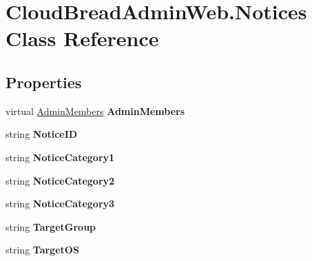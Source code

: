 \hypertarget{a00168}{}\section{Cloud\+Bread\+Admin\+Web.\+Notices Class Reference}
\label{a00168}
\subsection*{Properties}
\begin{DoxyCompactItemize}
\item 
virtual \hyperlink{a00012}{Admin\+Members} {\bfseries Admin\+Members}\hypertarget{a00168_a64a4c9bb292df1986b85b7c9a36f9769}{}\label{a00168_a64a4c9bb292df1986b85b7c9a36f9769}

\item 
string {\bfseries Notice\+ID}\hypertarget{a00168_a7ccb78d0c8fe58256fb0bac35031776d}{}\label{a00168_a7ccb78d0c8fe58256fb0bac35031776d}

\item 
string {\bfseries Notice\+Category1}\hypertarget{a00168_a081dd3d4d7ea9ab08e81cc1ee1d10a00}{}\label{a00168_a081dd3d4d7ea9ab08e81cc1ee1d10a00}

\item 
string {\bfseries Notice\+Category2}\hypertarget{a00168_ad5c8a50f4430a0965d29e778f2141360}{}\label{a00168_ad5c8a50f4430a0965d29e778f2141360}

\item 
string {\bfseries Notice\+Category3}\hypertarget{a00168_a54665edecf14bef7fb50415c831bc18f}{}\label{a00168_a54665edecf14bef7fb50415c831bc18f}

\item 
string {\bfseries Target\+Group}\hypertarget{a00168_a2cac4fb5245de32abb7030c9561b26b1}{}\label{a00168_a2cac4fb5245de32abb7030c9561b26b1}

\item 
string {\bfseries Target\+OS}\hypertarget{a00168_ae4e53567af717bd86fe8ea614e87b67c}{}\label{a00168_ae4e53567af717bd86fe8ea614e87b67c}


\end{DoxyCompactItemize}
